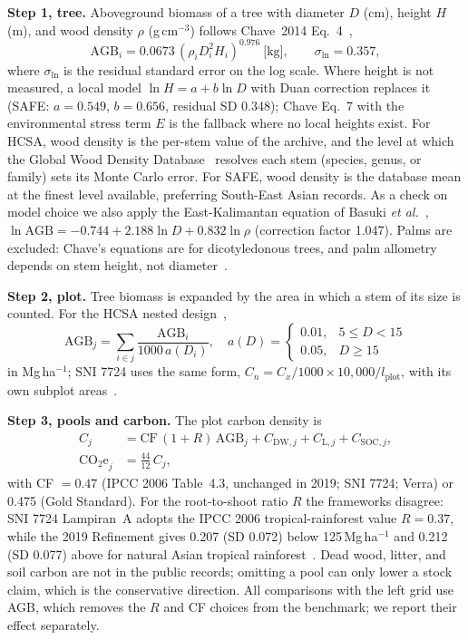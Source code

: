 \documentclass[conference,a4paper]{IEEEtran}
\begin{document}
\textbf{Step 1, tree.} Aboveground biomass of a tree with diameter $D$ (cm), height $H$ (m), and wood density $\rho$ (g\,cm$^{-3}$) follows Chave~2014 Eq.~4~\cite{chave2014improved},
\begin{equation}
\mathrm{AGB}_i=0.0673\,(\rho_i D_i^2 H_i)^{0.976}\ \text{[kg]},\qquad \sigma_{\ln}=0.357,
\label{eq:chave4}
\end{equation}
where $\sigma_{\ln}$ is the residual standard error on the log scale. Where height is not measured, a local model $\ln H=a+b\ln D$ with Duan correction replaces it (SAFE: $a=0.549$, $b=0.656$, residual SD 0.348); Chave Eq.~7 with the environmental stress term $E$ is the fallback where no local heights exist. For HCSA, wood density is the per-stem value of the archive, and the level at which the Global Wood Density Database~\cite{zanne2009gwdd,chave2009wood} resolves each stem (species, genus, or family) sets its Monte Carlo error. For SAFE, wood density is the database mean at the finest level available, preferring South-East Asian records. As a check on model choice we also apply the East-Kalimantan equation of Basuki \textit{et al.}~\cite{basuki2009allometric}, $\ln\mathrm{AGB}=-0.744+2.188\ln D+0.832\ln\rho$ (correction factor 1.047). Palms are excluded: Chave's equations are for dicotyledonous trees, and palm allometry depends on stem height, not diameter~\cite{goodman2013palm,lewis2020oilpalm}.

\textbf{Step 2, plot.} Tree biomass is expanded by the area in which a stem of its size is counted. For the HCSA nested design~\cite{rosoman2017hcsa},
\begin{equation}
\mathrm{AGB}_j=\sum_{i\in j}\frac{\mathrm{AGB}_i}{1000\,a(D_i)},\quad a(D)=\begin{cases}0.01,&5\le D<15\\0.05,&D\ge 15\end{cases}
\label{eq:expand}
\end{equation}
in Mg\,ha$^{-1}$; SNI 7724 uses the same form, $C_n=C_x/1000\times10{,}000/l_\text{plot}$, with its own subplot areas~\cite{sni7724}.

\textbf{Step 3, pools and carbon.} The plot carbon density is
\begin{equation}
\begin{aligned}
C_j&=\mathrm{CF}\,(1+R)\,\mathrm{AGB}_j + C_{\mathrm{DW},j}+C_{\mathrm{L},j}+C_{\mathrm{SOC},j},\\
\mathrm{CO_2e}_j&=\tfrac{44}{12}\,C_j,
\end{aligned}
\label{eq:pools}
\end{equation}
with CF $=0.47$ (IPCC 2006 Table~4.3, unchanged in 2019; SNI 7724; Verra) or 0.475 (Gold Standard). For the root-to-shoot ratio $R$ the frameworks disagree: SNI 7724 Lampiran~A adopts the IPCC 2006 tropical-rainforest value $R=0.37$, while the 2019 Refinement gives 0.207 (SD 0.072) below 125\,Mg\,ha$^{-1}$ and 0.212 (SD 0.077) above for natural Asian tropical rainforest~\cite{ipcc2006v4,ipcc2019v4}. Dead wood, litter, and soil carbon are not in the public records; omitting a pool can only lower a stock claim, which is the conservative direction. All comparisons with the left grid use AGB, which removes the $R$ and CF choices from the benchmark; we report their effect separately.
\end{document}

